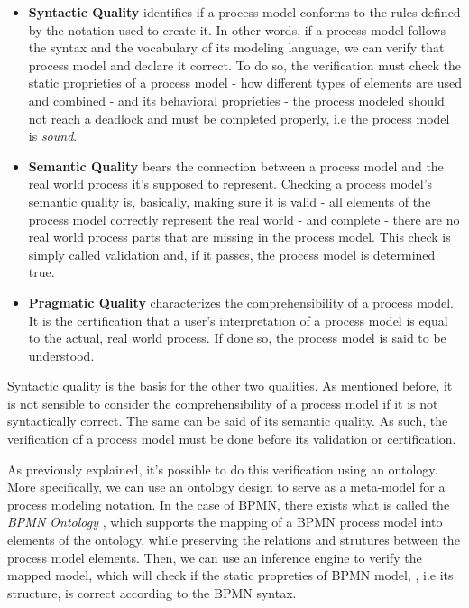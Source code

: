 \documentclass[a4paper,twoside]{article}
\begin{document}
\begin{itemize}
	\item \textbf{Syntactic Quality} identifies if a process model conforms to the rules defined by the notation used to create it. In other words, if a process model follows the syntax and the vocabulary of its modeling language, we can verify that process model and declare it correct. To do so, the verification must check the static proprieties of a process model - how different types of elements are used and combined - and its behavioral proprieties - the process modeled should not reach a deadlock and must be completed properly, i.e the process model is \textit{sound}.
	\item \textbf{Semantic Quality} bears the connection between a process model and the real world process it's supposed to represent. Checking a process model's semantic quality is, basically, making sure it is valid - all elements of the process model correctly represent the real world - and complete - there are no real world process parts that are missing in the process model. This check is simply called validation and, if it passes, the process model is determined true.
	\item \textbf{Pragmatic Quality} characterizes the comprehensibility of a process model. It is the certification that a user's interpretation of a process model is equal to the actual, real world process. If done so, the process model is said to be understood.
\end{itemize}

Syntactic quality is the basis for the other two qualities. As mentioned before, it is not sensible to consider the comprehensibility of a process model if it is not syntactically correct. The same can be said of its semantic quality. As such, the verification of a process model must be done before its validation or certification.

As previously explained, it's possible to do this verification using an ontology. More specifically, we can use an ontology design to serve as a meta-model for a process modeling notation. In the case of BPMN, there exists what is called the \textit{BPMN Ontology} \cite{Rospocher2014foisbpmn}, which supports the mapping of a BPMN process model into elements of the ontology, while preserving the relations and strutures between the process model elements. Then, we can use an inference engine to verify the mapped model, which will check if the static propreties of BPMN model, , i.e its structure, is correct according to the BPMN syntax.
\end{document}
